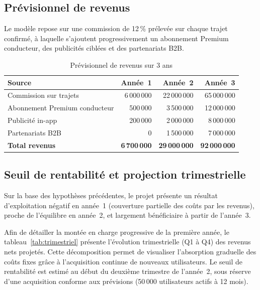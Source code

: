 \subsection{Prévisionnel de revenus}

Le modèle repose sur une commission de 12\,\% prélevée sur chaque trajet confirmé, à laquelle s'ajoutent progressivement un abonnement Premium conducteur, des publicités ciblées et des partenariats B2B.

\begin{table}[H]
\centering
\begin{tabularx}{\textwidth}{|X|r|r|r|}
\hline
\rowcolor{rohlight}
\textbf{Source} & \textbf{Année~1} & \textbf{Année~2} & \textbf{Année~3} \\
\hline
Commission sur trajets & 6\,000\,000 & 22\,000\,000 & 65\,000\,000 \\
\hline
Abonnement Premium conducteur & 500\,000 & 3\,500\,000 & 12\,000\,000 \\
\hline
Publicité in-app & 200\,000 & 2\,000\,000 & 8\,000\,000 \\
\hline
Partenariats B2B & 0 & 1\,500\,000 & 7\,000\,000 \\
\hline
\rowcolor{rohlight}
\textbf{Total revenus} & \textbf{6\,700\,000} & \textbf{29\,000\,000} & \textbf{92\,000\,000} \\
\hline
\end{tabularx}
  \caption{Prévisionnel de revenus sur 3 ans}
\end{table}

\subsection{Seuil de rentabilité et projection trimestrielle}

Sur la base des hypothèses précédentes, le projet présente un résultat d'exploitation négatif en année~1 (couverture partielle des coûts par les revenus), proche de l'équilibre en année~2, et largement bénéficiaire à partir de l'année~3. 

Afin de détailler la montée en charge progressive de la première année, le tableau~\ref{tab:trimestriel} présente l'évolution trimestrielle (Q1 à Q4) des revenus nets projetés. Cette décomposition permet de visualiser l'absorption graduelle des coûts fixes grâce à l'acquisition continue de nouveaux utilisateurs. Le seuil de rentabilité est estimé au début du deuxième trimestre de l'année~2, sous réserve d'une acquisition conforme aux prévisions (50\,000 utilisateurs actifs à 12 mois).

